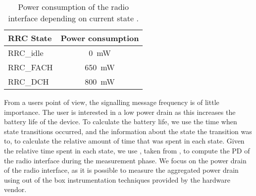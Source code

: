\begin{table}
  \centering
  \caption{Power consumption of the  radio interface depending on current  state \cite{Qian2011a}.}
  \label{tab:network:network_traces:calculating_metrics:power_consumption}  
  \begin{tabular}{lc}
  	\toprule
    \gls{RRC} State & Power consumption\\
    \midrule
    \gls{RRC_idle} & \SI{0}{\milli\watt}\\
    \gls{RRC_FACH} & \SI{650}{\milli\watt}\\
    \gls{RRC_DCH} & \SI{800}{\milli\watt}\\
    \bottomrule
  \end{tabular}
\end{table}

From a users point of view, the signalling message frequency is of little importance.
The user is interested in a low power drain as this increases the battery life of the device.
To calculate the battery life, we use the time when state transitions occurred, and the information about the state the transition was to, to calculate the relative amount of time that was spent in each state.
Given the relative time spent in each state, we use , taken from \cite{Qian2011a}, to compute the \gls{PD} of the radio interface during the measurement phase.
We focus on the power drain of the radio interface, as it is possible to measure the aggregated power drain using out of the box instrumentation techniques provided by the hardware vendor.